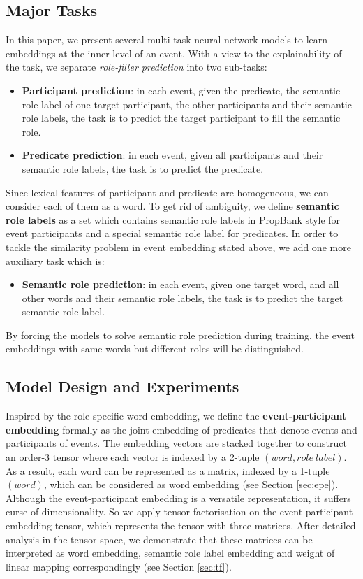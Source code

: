 \documentclass[a4paper]{article}
\begin{document}
\subsection{Major Tasks} \label{sec:tasks}
In this paper, we present several multi-task neural network models to learn embeddings at the inner level of an event. With a view to the explainability of the task, we separate \textit{role-filler prediction} into two sub-tasks: 
\begin{itemize}
  \item  \textbf{Participant prediction}: in each event, given the predicate, the semantic role label of one target participant, the other participants and their semantic role labels, the task is to predict the target participant to fill the semantic role. 
  \item  \textbf{Predicate prediction}: in each event, given all participants and their semantic role labels, the task is to predict the predicate. 
\end{itemize}
Since lexical features of participant and predicate are homogeneous, we can consider each of them as a word. To get rid of ambiguity, we define \textbf{semantic role labels} as a set which contains semantic role labels in PropBank style for event participants and a special semantic role label for predicates. In order to tackle the similarity problem in event embedding stated above, we add one more auxiliary task which is: 
\begin{itemize}
  \item  \textbf{Semantic role prediction}: in each event, given one target word, and all other words and their semantic role labels, the task is to predict the target semantic role label. 
\end{itemize}
By forcing the models to solve semantic role prediction during training, the event embeddings with same words but different roles will be distinguished. 

\subsection{Model Design and Experiments} \label{sec:steps}
Inspired by the role-specific word embedding, we define the \textbf{event-participant embedding} formally as the joint embedding of predicates that denote events and participants of events. The embedding vectors are stacked together to construct an order-3 tensor where each vector is indexed by a 2-tuple $(word, role\ label)$. As a result, each word can be represented as a matrix, indexed by a 1-tuple $(word)$, which can be considered as word embedding (see Section \ref{sec:epe}). Although the event-participant embedding is a versatile representation, it suffers curse of dimensionality. So we apply tensor factorisation on the event-participant embedding tensor, which represents the tensor with three matrices. After detailed analysis in the tensor space, we demonstrate that these matrices can be interpreted as word embedding, semantic role label embedding and weight of linear mapping correspondingly (see Section \ref{sec:tf}). 
\end{document}
